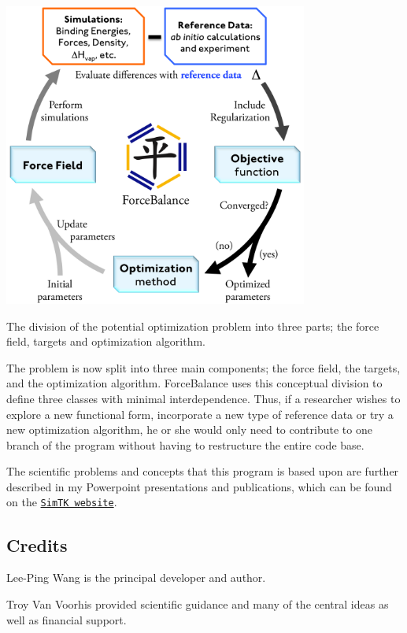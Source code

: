 \begin{DoxyImage}
\includegraphics[height=10cm]{cycle.png}
\caption{The division of the potential optimization problem into three parts; the force field, targets and optimization algorithm.}
\end{DoxyImage}


The problem is now split into three main components; the force field, the targets, and the optimization algorithm. Force\-Balance uses this conceptual division to define three classes with minimal interdependence. Thus, if a researcher wishes to explore a new functional form, incorporate a new type of reference data or try a new optimization algorithm, he or she would only need to contribute to one branch of the program without having to restructure the entire code base.

The scientific problems and concepts that this program is based upon are further described in my Powerpoint presentations and publications, which can be found on the \href{https://simtk.org/home/forcebalance/}{\tt Sim\-T\-K website}.\hypertarget{index_credits}{}\subsection{Credits}\label{index_credits}

\begin{DoxyItemize}
\item Lee-\/\-Ping Wang is the principal developer and author.
\end{DoxyItemize}


\begin{DoxyItemize}
\item Troy Van Voorhis provided scientific guidance and many of the central ideas as well as financial support.
\end{DoxyItemize}


